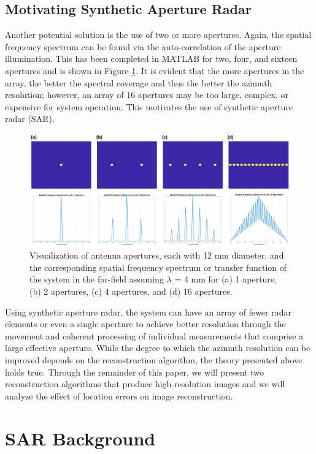 \documentclass{article}
\begin{document}
\subsection*{Motivating Synthetic Aperture Radar}
\indent \indent
Another potential solution is the use of two or more apertures. Again, the spatial frequency spectrum can be found via the auto-correlation of the aperture illumination. This has been completed in MATLAB for two, four, and sixteen apertures and is shown in Figure \ref{AzRes}. It is evident that the more apertures in the array, the better the spectral coverage and thus the better the azimuth resolution; however, an array of 16 apertures may be too large, complex, or expensive for system operation. This motivates the use of synthetic aperture radar (SAR). 
\begin{figure}[h!]
    \centering
    \includegraphics[width=\textwidth]{Figures/AzRes.png}
\caption{Visualization of antenna apertures, each with 12 mm diameter, and the corresponding spatial frequency spectrum or transfer function of the system in the far-field assuming $\lambda$ = 4 mm for (a) 1 aperture, (b) 2 apertures, (c) 4 apertures, and (d) 16 apertures. }
\label{AzRes}
\end{figure}
\newline
\indent
Using synthetic aperture radar, the system can have an array of fewer radar elements or even a single aperture to achieve better resolution through the movement and coherent processing of individual measurements that comprise a large effective aperture. While the degree to which the azimuth resolution can be improved depends on the reconstruction algorithm, the theory presented above holds true. Through the remainder of this paper, we will present two reconstruction algorithms that produce high-resolution images and we will analyze the effect of location errors on image reconstruction.

\section{SAR Background}
\end{document}

